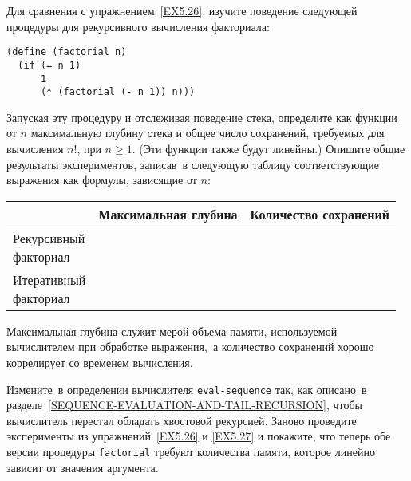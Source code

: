 \begin{exercise}{5.27}%
\label{EX5.27}%
Для сравнения с упражнением~\ref{EX5.26},
изучите поведение следующей процедуры для рекурсивного вычисления
факториала:

\begin{Verbatim}[fontsize=\small]
(define (factorial n)
  (if (= n 1)
      1
      (* (factorial (- n 1)) n)))
\end{Verbatim}
Запуская эту процедуру и отслеживая поведение стека, определите как
функции от $n$ максимальную глубину стека и общее число
сохранений, требуемых для вычисления $n!$, при $n \ge
1$.  (Эти функции также будут линейны.)  Опишите общие
результаты экспериментов, записав~в следующую таблицу соответствующие
выражения как формулы, зависящие от $n$:

\medskip
\begin{tabular}{|l|l|l|}
\hline
                 & Максимальная глубина & Количество сохранений \\
\hline
\parbox{3cm}{Рекурсивный\\ факториал} & &\\
\hline
\parbox{3cm}{Итеративный\\ факториал} & &\\
\hline
\end{tabular}
\medskip
\par\noindent
Максимальная глубина служит мерой объема памяти, используемой
вычислителем при обработке выражения,~а количество сохранений хорошо
коррелирует со временем вычисления. 
\end{exercise}
\begin{exercise}{5.28}%
\label{EX5.28}%
Измените~в определении  вычислителя
{\tt eval-sequence} так, как описано~в 
разделе~\ref{SEQUENCE-EVALUATION-AND-TAIL-RECURSION}, чтобы
вычислитель перестал обладать %
%
хвостовой рекурсией.  Заново проведите
эксперименты из упражнений~\ref{EX5.26} и \ref{EX5.27}
 и покажите, что теперь обе версии процедуры {\tt factorial}
требуют количества памяти, которое линейно зависит от значения аргумента.
\end{exercise}

